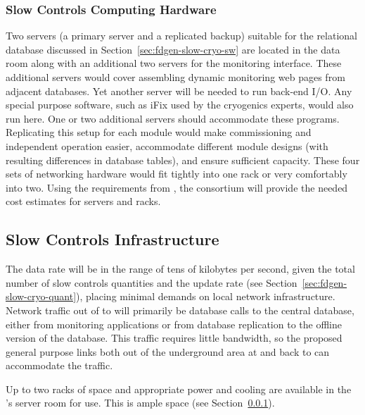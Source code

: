 \subsubsection{Slow Controls Computing Hardware}
\label{sec:fdgen-slow-cryo-slow-compute}
Two servers (a primary server and a replicated backup) suitable for the relational database discussed
in Section~\ref{sec:fdgen-slow-cryo-sw} are located in the  data
room along with an additional
two servers for the  monitoring interface. These additional servers would cover assembling dynamic  monitoring web pages from adjacent
databases.  Yet another server will be needed to run back-end I/O.  Any special purpose software, such as iFix used by the cryogenics experts, would
also run here. One or two additional servers should accommodate these programs.
Replicating this setup for each module would make commissioning and independent operation easier, accommodate different module
designs (with resulting differences in database tables), and ensure
sufficient capacity.  These four sets of networking hardware would fit tightly into one rack or very comfortably into two. Using the requirements from , the  consortium will provide the needed cost estimates for servers and racks.



\subsection{Slow Controls Infrastructure}
\label{sec:fdgen-slow-cryo-slow-infra}

The data rate will be in the range of tens of kilobytes per second, given the total number of slow controls quantities and the update rate  
(see Section~\ref{sec:fdgen-slow-cryo-quant}), placing minimal demands
on local network infrastructure.
Network traffic out of   to  will primarily be database calls
to the central  database, either from monitoring applications or from
database replication to the offline version of the  database.  This
traffic requires little bandwidth, so the proposed general purpose
links both out of the %
underground area at   and back to   can accommodate the traffic.

Up to two racks of space and appropriate power and cooling are
available in the 's  server room for  use. This is ample space (see Section~\ref{sec:fdgen-slow-cryo-slow-compute}).


